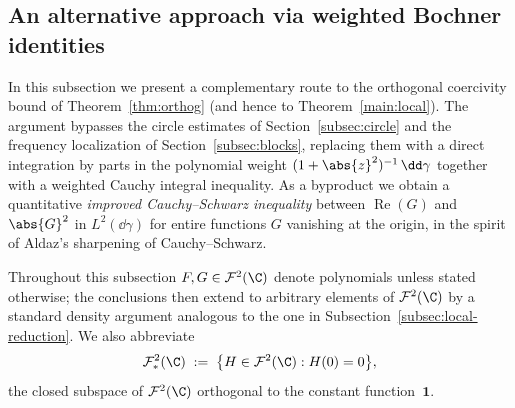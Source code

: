 %
%

\subsection{An alternative approach via weighted Bochner identities}\label{subsec:bochner}

In this subsection we present a complementary route to the orthogonal
coercivity bound of Theorem~\ref{thm:orthog} (and hence to
Theorem~\ref{main:local}). The argument bypasses the circle estimates
of Section~\ref{subsec:circle} and the frequency localization of
Section~\ref{subsec:blocks}, replacing them with a direct integration
by parts in the polynomial weight $(1+\abs{z}^2)^{-1}\,\dd\gamma$ together
with a weighted Cauchy integral inequality. As a byproduct we obtain a
quantitative \emph{improved Cauchy--Schwarz inequality} between
$\operatorname{Re}(G)$ and $\abs{G}^2$ in $L^2(\dd\gamma)$ for entire
functions $G$ vanishing at the origin, in the spirit of Aldaz's
sharpening of Cauchy--Schwarz.

\medskip

Throughout this subsection $F, G \in \mathcal{F}^2(\C)$ denote polynomials
unless stated otherwise; the conclusions then extend to arbitrary
elements of $\mathcal{F}^2(\C)$ by a standard density argument analogous
to the one in Subsection~\ref{subsec:local-reduction}. We also abbreviate
\[
\mathcal{F}^2_\ast(\C) \;:=\; \bigl\{H \in \mathcal{F}^2(\C) : H(0) = 0\bigr\},
\]
the closed subspace of $\mathcal{F}^2(\C)$ orthogonal to the constant
function~$\mathbf{1}$.

